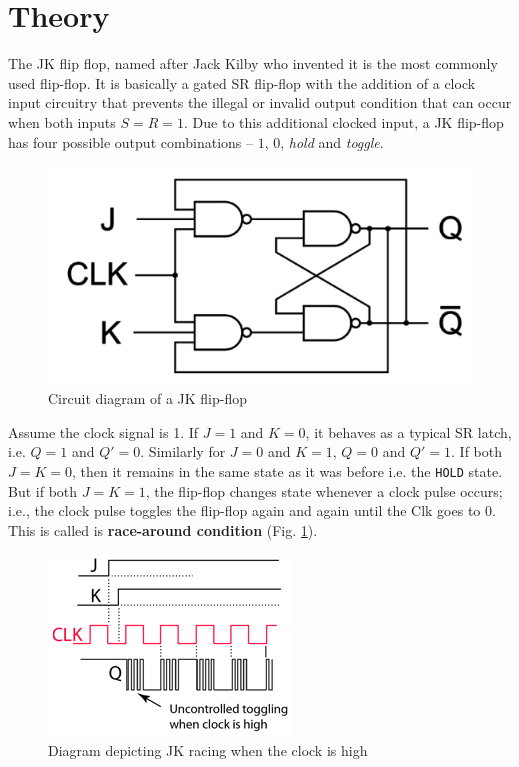 \section{Theory}

The JK flip flop, named after Jack Kilby who invented it is
the most commonly used flip-flop.
It is basically a gated SR flip-flop with the addition of a clock input circuitry that prevents the illegal or invalid output condition that can occur when both inputs $S=R=1$. Due to this additional clocked input, a JK flip-flop has four possible output combinations -- $1$, $0$, \textit{hold} and \textit{toggle}.

\begin{figure}[H]
    \centering
    \includegraphics[width=0.65\columnwidth]{images/jk.png}
    \caption{Circuit diagram of a JK flip-flop}
\end{figure}

Assume the clock signal is 1. If $J=1$ and $K=0$, it behaves as a typical SR latch, i.e. $Q=1$ and $Q'=0$. Similarly for $J=0$ and $K=1$, $Q=0$ and $Q'=1$. If both $J=K=0$, then it remains in the same state as it was before i.e. the \verb|HOLD| state.
But if both $J=K=1$, the flip-flop changes state whenever a clock
pulse occurs; i.e., the clock pulse toggles the flip-flop again and again until the Clk goes to 0. This is called is \textbf{race-around condition} (Fig. \ref{race}).

\begin{figure}[H]
    \centering
    \includegraphics[width=0.5\columnwidth]{images/jkrace.png}
    \caption{Diagram depicting JK racing when the clock is high}
    \label{race}
\end{figure}

